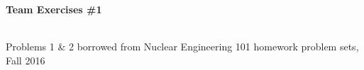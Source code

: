 \documentclass{report}
\begin{document}
\thispagestyle{FirstPage}
\begin{center}
\textbf{\large Team Exercises \#1}

\-\\
{\small *Problems 1 \& 2 borrowed from Nuclear Engineering 101 homework problem sets, Fall 2016}
\end{center}


\newpage


\newpage


\newpage


\end{document}
